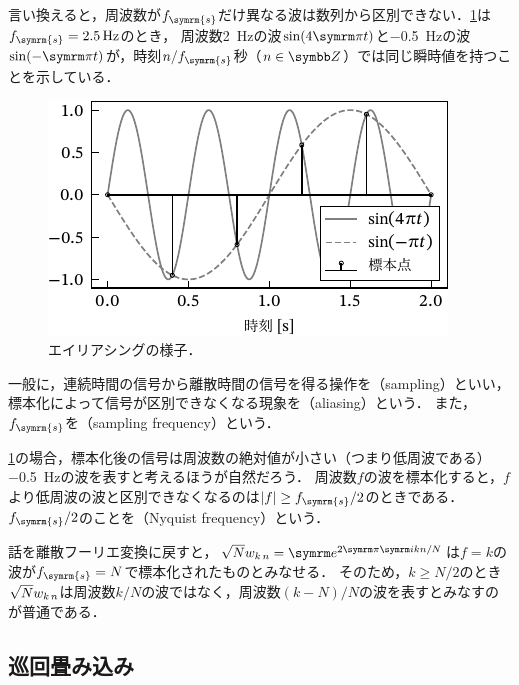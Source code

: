 \documentclass[../../main]{subfiles}
\begin{document}
言い換えると，周波数が\(f_{\symrm{s}}\)だけ異なる波は数列から区別できない．\cref{figure:aliasing}は\(f_{\symrm{s}}=\SI{2.5}{Hz}\)のとき，
周波数\SI{2}{Hz}の波\(\sin(4\krez t)\)と\SI{-0.5}{Hz}の波\(\sin(-\krez t)\)が，時刻\(n/f_{\symrm{s}}\)秒（\(n\in\numset{Z}\)）では同じ瞬時値を持つことを示している．

\begin{figure}[htbp]
  \centering
  \includegraphics{figures/aliasing.pdf}
  \caption{エイリアシングの様子．}
  \label{figure:aliasing}
\end{figure}

一般に，連続時間の信号から離散時間の信号を得る操作を（sampling）といい，標本化によって信号が区別できなくなる現象を（aliasing）という．
また，\(f_{\symrm{s}}\)を（sampling frequency）という．

\cref{figure:aliasing}の場合，標本化後の信号は周波数の絶対値が小さい（つまり低周波である）\SI{-0.5}{Hz}の波を表すと考えるほうが自然だろう．
周波数\(f\)の波を標本化すると，\(f\)より低周波の波と区別できなくなるのは\(\abs{f}\geq f_{\symrm{s}}/2\)のときである．\(f_{\symrm{s}}/2\)のことを（Nyquist frequency）という．

話を離散フーリエ変換に戻すと，\(\sqrt{N}\midx{w}{k}{n}=\napr^{2\krez\iuni kn/N}\)は\(f=k\)の波が\(f_{\symrm{s}}=N\)で標本化されたものとみなせる．
そのため，\(k\geq N/2\)のとき\(\sqrt{N}w_{k\,n}\)は周波数\(k/N\)の波ではなく，周波数\((k-N)/N\)の波を表すとみなすのが普通である．

\subsection{巡回畳み込み}
\end{document}
